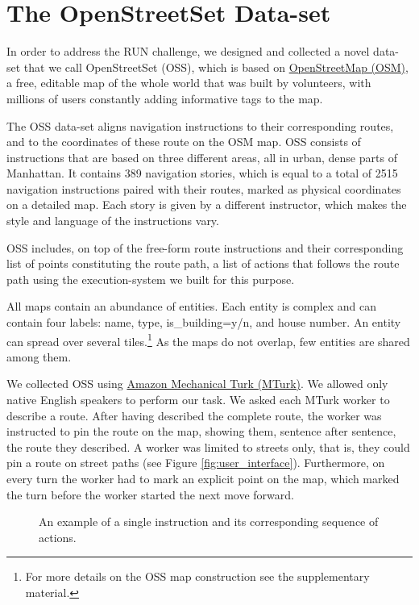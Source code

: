 \documentclass[11pt,a4paper]{article}
\begin{document}
 
\section{The OpenStreetSet Data-set}
\label{data}

In order to address the RUN challenge, we designed and collected a novel data-set that we call  OpenStreetSet (OSS), which is based on \href{http://www.openstreetmap.org}{OpenStreetMap (OSM)}, a free, editable map of the whole world that was built by volunteers, with millions of users constantly adding informative tags to the map.

The OSS data-set aligns navigation instructions to their corresponding  routes, and to the coordinates of these route on the OSM map. OSS consists of instructions  that are based on three different areas, all in urban, dense parts of Manhattan. 
It contains 389 navigation stories, which is equal to a total of 2515 navigation instructions paired with their routes, marked as physical coordinates on a detailed map. Each story is given by a different instructor, which makes the style and language of the instructions vary.

OSS includes, on top of the free-form route instructions and their corresponding list of points constituting the route path,  a list of actions that follows the route path using the execution-system we built for this purpose. 

All maps contain an abundance of entities.
Each entity is complex and can contain four labels: name, type, is\_building=y/n, and house number. An entity can spread over several tiles.\footnote{For more details on the OSS map construction see the supplementary  material.} 
As the maps do not overlap, few entities are shared among them. 

We collected OSS  using
\href{https://www.mturk.com/}{Amazon Mechanical Turk (MTurk)}.
We allowed only native English speakers to perform our task. 
We asked each MTurk worker to describe a route. After having described the complete route, the worker was instructed to pin the route on the map, showing them, sentence after sentence, the route they described. A worker was limited to streets only, that is, they could pin a route on street paths (see Figure \ref{fig:user_interface}). Furthermore, on every turn the worker had to mark an explicit point on the map, which marked the turn before the worker started the next move forward.


 
 \begin{figure}[ht]

  \center
{}
         
        \caption
        {An example of a single instruction and its corresponding sequence of actions.} 
        \label{fig:action_example}
    \end{figure}
\end{document}
